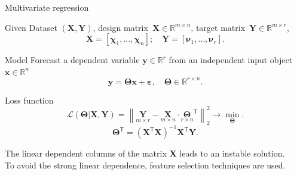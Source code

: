 \documentclass[9pt]{beamer}
\newcommand{\bx}{\mathbf{x}}
\newcommand{\by}{\mathbf{y}}
\newcommand{\bY}{\mathbf{Y}}
\newcommand{\bX}{\mathbf{X}}
\newcommand{\bbR}{\mathbb{R}}
\newcommand{\bchi}{\boldsymbol{\chi}}
\newcommand{\bnu}{\boldsymbol{\nu}}
\newcommand{\bTheta}{\boldsymbol{\Theta}}
\newcommand{\T}{\mathsf{T}}
\begin{document}
\begin{frame}{Multivariate regression}
	\begin{block}{Given}
	Dataset $\left( \bX, \bY \right)$, design matrix~$\bX \in \bbR^{m \times n}$, target matrix~$\bY \in \bbR^{m \times r}$,
	\[
	\bX = [\bchi_1, \dots, \bchi_n]; \quad \bY =  [\bnu_1, \dots, \bnu_r].
	\]
	\vspace{-0.7cm}
	\end{block}

\begin{block}{Model}
	Forecast a dependent variable $\by \in \bbR^r$ from an independent input object $\bx \in \bbR^n$
	\[
	\by = \bTheta \bx+ \boldsymbol{\varepsilon}, \quad \bTheta \in \bbR^{r \times n}.
	\]
	\vspace{-0.7cm}
\end{block}
	\begin{block}{Loss function}
	\[
	\mathcal{L}(\bTheta | \bX, \bY) = {\left\| \underset{m \times r}{\mathbf{Y}}  - \underset{m \times n}{\bX} \cdot \underset{r \times n}{\bTheta}^{\T} \right\| }_2^2 \rightarrow\min_{\bTheta}.
	\label{eq:error_function}
	\]
	\[
	\bTheta^{\T} = (\bX^{\T} \bX)^{-1} \bX^{\T} \bY.
	\]
	\end{block}
	The linear dependent columns of the matrix $\bX$ leads to an instable solution. \\
	To avoid the strong linear dependence, feature selection techniques are used.
\end{frame}
\end{document}
